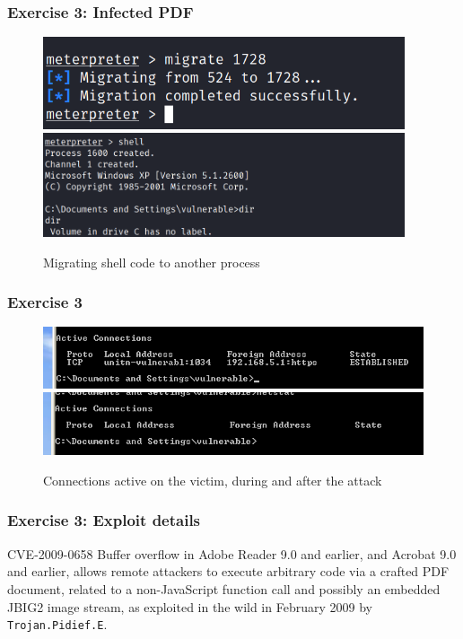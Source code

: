 \documentclass[handout]{beamer}
\begin{document}
\begin{frame}
    \frametitle{Exercise 3: Infected PDF}
    \begin{figure}
        \centering
        \includegraphics[width=0.95\textwidth]{../drawable/exercise_3_screenshots/meterpreter_migration.png}
        \includegraphics[width=0.95\textwidth]{../drawable/exercise_3_screenshots/meterpreter_shell_opened_cropped.png}
        \caption{Migrating shell code to another process}
    \end{figure}
\end{frame}

\begin{frame}
    \frametitle{Exercise 3}
    \begin{figure}
        \centering
        \includegraphics[width=\textwidth]{../drawable/exercise_3_screenshots/victim_connection.PNG}
        \includegraphics[width=\textwidth]{../drawable/exercise_3_screenshots/victim_connections_after_exit.PNG}
        \caption{Connections active on the victim, during and after the attack}
    \end{figure}
\end{frame}

\begin{frame}
    \frametitle{Exercise 3: Exploit details}
    \begin{block}{CVE-2009-0658}
        Buffer overflow in Adobe Reader 9.0 and earlier, and Acrobat 9.0 and earlier, allows remote attackers to execute arbitrary code via a crafted PDF document, related to a non-JavaScript function call and possibly an embedded JBIG2 image stream, as exploited in the wild in February 2009 by \texttt{Trojan.Pidief.E}.
    \end{block}
\end{frame}
\end{document}
